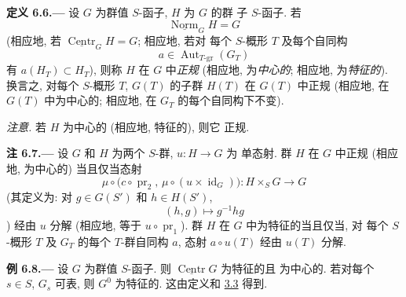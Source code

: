 
\medskip
{}\label{def:sga3-VIB-6.6}%
\noindent\textbf{定义 6.6.---}
设 \(G\) 为群值 \(S\)-函子, \(H\) 为 \(G\) 的群
子 \(S\)-函子. 若
\[
  \underline{\operatorname{Norm}}_G H=G
\]
(相应地, 若
\(\underline{\operatorname{Centr}}_G H=G\); 相应地, 若对
每个 \(S\)-概形 \(T\) 及每个自同构
\[
  a\in\operatorname{Aut}_{T\text{-}\mathrm{gr}}(G_T)
\]
有 \(a(H_T)\subset H_T\)), 则称 \(H\) 在 \(G\) 中\emph{正规}
(相应地, 为\emph{中心的}; 相应地, 为\emph{特征的}). 换言之, 对每个
\(S\)-概形 \(T\), \(G(T)\) 的子群 \(H(T)\) 在 \(G(T)\) 中正规
(相应地, 在 \(G(T)\) 中为中心的; 相应地,
在 \(G_T\) 的每个自同构下不变).

\noindent\emph{注意.}
若 \(H\) 为中心的 (相应地, 特征的), 则它
正规.

\medskip
{}\label{rem:sga3-VIB-6.7}%
\noindent\textbf{注 6.7.---}
设 \(G\) 和 \(H\) 为两个 \(S\)-群, \(u:H\to G\) 为
单态射. 群 \(H\) 在 \(G\) 中正规 (相应地,
为中心的) 当且仅当态射
\[
  \mu\circ
  \bigl(c\circ\operatorname{pr}_2,\,
        \mu\circ(u\times\operatorname{id}_G)\bigr)
  :H\times_S G\longrightarrow G
\]
(其定义为: 对 \(g\in G(S')\) 和 \(h\in H(S')\),
\[
  (h,g)\longmapsto g^{-1}hg
\]
) 经由 \(u\) 分解
(相应地, 等于 \(u\circ\operatorname{pr}_1\)).
群 \(H\) 在 \(G\) 中为特征的当且仅当, 对
每个 \(S\)-概形 \(T\) 及 \(G_T\) 的每个 \(T\)-群自同构 \(a\),
态射 \(a\circ u(T)\) 经由 \(u(T)\) 分解.

\medskip
{}\label{ex:sga3-VIB-6.8}%
\noindent\textbf{例 6.8.---}
设 \(G\) 为群值 \(S\)-函子. 则
\(\underline{\operatorname{Centr}}G\) 为特征的且
为中心的. 若对每个 \(s\in S\), \(G_s\) 可表, 则
\(G^0\) 为特征的. 这由定义和
\hyperref[prop:sga3-VIB-3.3]{3.3} 得到.

